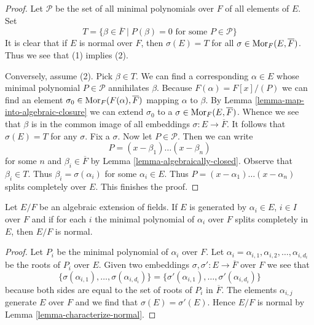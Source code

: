 \begin{proof}
Let $\mathcal{P}$ be the set of all minimal polynomials over $F$ of
all elements of $E$. Set
$$
T =
\{\beta \in \overline{F} \mid P(\beta) = 0\text{ for some }P \in \mathcal{P}\}
$$
It is clear that if $E$ is normal over $F$, then $\sigma(E) = T$
for all $\sigma \in \mathop{\mathrm{Mor}}\nolimits_F(E, \overline{F})$. Thus we see that (1)
implies (2).

\medskip\noindent
Conversely, assume (2). Pick $\beta \in T$.
We can find a corresponding $\alpha \in E$ whose minimal polynomial
$P \in \mathcal{P}$ annihilates $\beta$. Because $F(\alpha) = F[x]/(P)$
we can find an element $\sigma_0 \in \mathop{\mathrm{Mor}}\nolimits_F(F(\alpha), \overline{F})$ mapping
$\alpha$ to $\beta$. By Lemma \ref{lemma-map-into-algebraic-closure}
we can extend $\sigma_0$ to a $\sigma \in \mathop{\mathrm{Mor}}\nolimits_F(E, \overline{F})$.
Whence we see that $\beta$ is in the common image of all embeddings
$\sigma : E \to \overline{F}$. It follows that $\sigma(E) = T$
for any $\sigma$. Fix a $\sigma$. Now let $P \in \mathcal{P}$. Then we
can write
$$
P = (x - \beta_1) \ldots (x - \beta_n)
$$
for some $n$ and $\beta_i \in \overline{F}$ by
Lemma \ref{lemma-algebraically-closed}. Observe that $\beta_i \in T$.
Thus $\beta_i = \sigma(\alpha_i)$ for some $\alpha_i \in E$. Thus
$P = (x - \alpha_1) \ldots (x - \alpha_n)$ splits completely over $E$.
This finishes the proof.
\end{proof}

\begin{lemma}
\label{lemma-normally-generated}
Let $E/F$ be an algebraic extension of fields.
If $E$ is generated by $\alpha_i \in E$, $i \in I$
over $F$ and if for each $i$ the minimal polynomial
of $\alpha_i$ over $F$ splits completely in $E$, then
$E/F$ is normal.
\end{lemma}

\begin{proof}
Let $P_i$ be the minimal polynomial of $\alpha_i$ over $F$.
Let $\alpha_i = \alpha_{i, 1}, \alpha_{i, 2}, \ldots, \alpha_{i, d_i}$
be the roots of $P_i$ over $E$. Given two embeddings
$\sigma, \sigma' : E \to \overline{F}$ over $F$ we see that
$$
\{\sigma(\alpha_{i, 1}), \ldots, \sigma(\alpha_{i, d_i})\} =
\{\sigma'(\alpha_{i, 1}), \ldots, \sigma'(\alpha_{i, d_i})\}
$$
because both sides are equal to the set of roots of $P_i$
in $\overline{F}$. The elements $\alpha_{i, j}$
generate $E$ over $F$ and we find that $\sigma(E) = \sigma'(E)$.
Hence $E/F$ is normal by Lemma \ref{lemma-characterize-normal}.
\end{proof}

